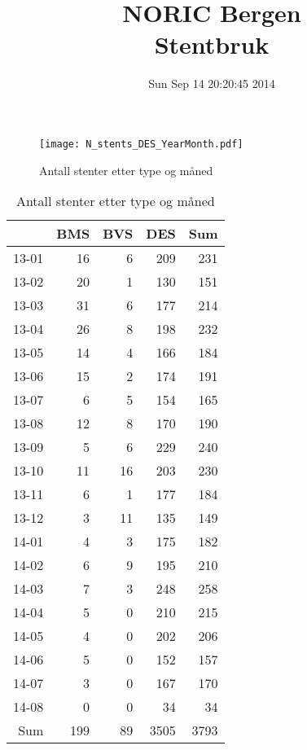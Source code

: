 \documentclass[presentation,xcolor=pdftex,dvipsnames,table]{beamer}
\title{NORIC Bergen \\Stentbruk}\date{ Sun Sep 14 20:20:45 2014 }
\begin{document}
\maketitle



\begin{frame}
\begin{figure}
  \centering
  \caption{Antall stenter etter type og måned}
  

\texttt{[image: N\_stents\_DES\_YearMonth.pdf]}
\end{figure}
\end{frame}



\begin{frame}
\begin{tiny}
\begin{table}[ht]
\centering
\begin{tabular}{rrrrr}
  \toprule
 & BMS & BVS & DES & Sum \\ 
  \midrule
13-01 & 16 & 6 & 209 & 231 \\ 
  13-02 & 20 & 1 & 130 & 151 \\ 
  13-03 & 31 & 6 & 177 & 214 \\ 
  13-04 & 26 & 8 & 198 & 232 \\ 
  13-05 & 14 & 4 & 166 & 184 \\ 
  13-06 & 15 & 2 & 174 & 191 \\ 
  13-07 & 6 & 5 & 154 & 165 \\ 
  13-08 & 12 & 8 & 170 & 190 \\ 
  13-09 & 5 & 6 & 229 & 240 \\ 
  13-10 & 11 & 16 & 203 & 230 \\ 
  13-11 & 6 & 1 & 177 & 184 \\ 
  13-12 & 3 & 11 & 135 & 149 \\ 
  14-01 & 4 & 3 & 175 & 182 \\ 
  14-02 & 6 & 9 & 195 & 210 \\ 
  14-03 & 7 & 3 & 248 & 258 \\ 
  14-04 & 5 & 0 & 210 & 215 \\ 
  14-05 & 4 & 0 & 202 & 206 \\ 
  14-06 & 5 & 0 & 152 & 157 \\ 
  14-07 & 3 & 0 & 167 & 170 \\ 
  14-08 & 0 & 0 & 34 & 34 \\ 
  Sum & 199 & 89 & 3505 & 3793 \\ 
   \bottomrule
\end{tabular}
\caption{Antall stenter etter type og måned} 
\end{table}\end{tiny}
\end{frame}
\end{document}
